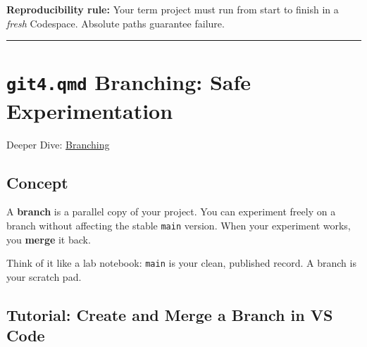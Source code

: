 \documentclass[
  letterpaper,
  DIV=11,
  numbers=noendperiod,
  oneside]{scrreprt}
\begin{document}
\begin{tcolorbox}[enhanced jigsaw, title=\textcolor{quarto-callout-warning-color}{\faExclamationTriangle}\hspace{0.5em}{Warning}, arc=.35mm, toptitle=1mm, colframe=quarto-callout-warning-color-frame, toprule=.15mm, leftrule=.75mm, bottomtitle=1mm, opacityback=0, bottomrule=.15mm, coltitle=black, breakable, opacitybacktitle=0.6, titlerule=0mm, colback=white, left=2mm, colbacktitle=quarto-callout-warning-color!10!white, rightrule=.15mm]

\textbf{Reproducibility rule:} Your term project must run from start to
finish in a \emph{fresh} Codespace. Absolute paths guarantee failure.

\end{tcolorbox}

\begin{center}\rule{0.5\linewidth}{0.5pt}\end{center}

\section*{\texorpdfstring{\texttt{git4.qmd} Branching: Safe
Experimentation}{git4.qmd Branching: Safe Experimentation}}\label{git4.qmd-branching-safe-experimentation}


Deeper Dive: \href{git04-branching.qmd}{Branching}

\subsection*{Concept}\label{concept}

A \textbf{branch} is a parallel copy of your project. You can experiment
freely on a branch without affecting the stable \texttt{main} version.
When your experiment works, you \textbf{merge} it back.

Think of it like a lab notebook: \texttt{main} is your clean, published
record. A branch is your scratch pad.

\subsection*{Tutorial: Create and Merge a Branch in VS
Code}\label{tutorial-create-and-merge-a-branch-in-vs-code}
\end{document}
